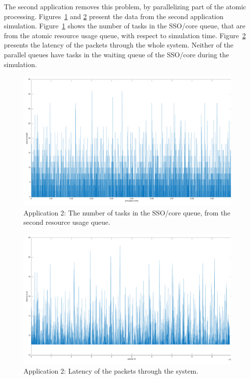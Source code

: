 The second application removes this problem, by parallelizing part of the atomic processing. Figures~\ref{fig:app2-queue2} and \ref{fig:app2-latency} present the data from the second application simulation. Figure~\ref{fig:app2-queue2} shows the number of tasks in the SSO/core queue, that are from the atomic resource usage queue, with respect to simulation time. Figure~\ref{fig:app2-latency} presents the latency of the packets through the whole system. Neither of the parallel queues have tasks in the waiting queue of the SSO/core during the simulation.

\begin{figure}[]
  \begin{center}
    \includegraphics[width=\textwidth]{images/app2-queue2.pdf}
    \caption{Application 2: The number of tasks in the SSO/core queue, from the second resource usage queue.}
    \label{fig:app2-queue2}
  \end{center}
\end{figure}

\begin{figure}[]
  \begin{center}
    \includegraphics[width=\textwidth]{images/app2-latency.pdf}
    \caption{Application 2: Latency of the packets through the system.}
    \label{fig:app2-latency}
  \end{center}
\end{figure}

